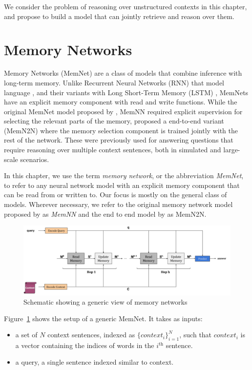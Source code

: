 We consider the problem of reasoning over unstructured contexts in this chapter, and propose to build a model that can jointly retrieve and
reason over them.

\section{Memory Networks}
Memory Networks (MemNet) are a class of models
that combine inference with long-term memory. Unlike Recurrent Neural Networks
(RNN) that model language \citep{mikolov2010recurrent}, and their variants with
Long Short-Term Memory (LSTM) \citep{hochreiter1997long}, MemNets have an explicit
memory component with read and write functions. While the original MemNet model 
proposed by \cite{weston2014memory}, MemNN required explicit supervision
for selecting the relevant parts of the memory, \citep{sukhbaatar2015end}
proposed a end-to-end variant (MemN2N) where the memory selection component is
trained jointly with the rest of the network. These were previously used for
answering questions that require reasoning over multiple context sentences,
both in simulated \citep{bordes2010towards} and large-scale
\citep{fader2013paraphrase} scenarios.

In this chapter, we use the term \textit{memory network},
or the abbreviation \textit{MemNet}, to refer to any neural network model with an explicit memory component
that can be read from or written to. Our focus is mostly on the general class of models. Wherever necessary,
we refer to the original memory network model
proposed by \cite{weston2014memory} as \textit{MemNN} and the end to end model by \cite{sukhbaatar2015end}
as MemN2N.


\begin{figure}
\begin{center}
  \includegraphics[width=7in]{figures/memory_network_generic.png}
  \caption{Schematic showing a generic view of memory networks}
  \label{fig:memnet}
  \end{center}
\end{figure}
Figure~\ref{fig:memnet} shows the setup of a generic MemNet. It
takes as inputs:
\begin{itemize}
 \item a set of $N$ context sentences, indexed as $\{context_i\}_{i=1}^N$,
such that $context_i$ is a vector containing the indices of words in the $i^\text{th}$ sentence.
  \item a query, a single sentence indexed similar to context.
\end{itemize}


